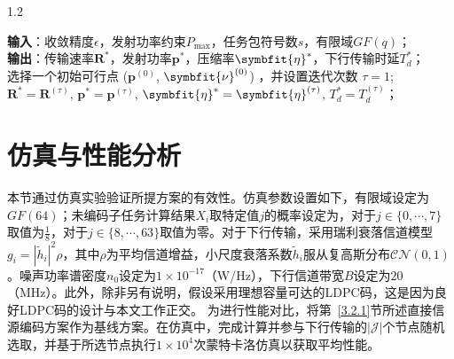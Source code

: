 \begin{algorithm}[h]
	\renewcommand{\thealgocf}{3.1}
	\begin{spacing}{1.2}
		{

			\caption{面向完整恢复的DSC辅助编码计算结果下行传输算法}
				\label{algorithm1}
			\LinesNumbered
 \textbf{输入}：收敛精度$\epsilon$，发射功率约束$P_{\max}$，任务包符号数$s$，有限域$GF(q)$；\\
\textbf{输出}：传输速率$\mathbf{R}^*$，发射功率$\mathbf{p}^*$，压缩率$\symbfit{\eta}^*$，下行传输时延$T_d^*$；\\

	选择一个初始可行点 ($\mathbf{p}^{(0)}$, $\symbfit{\nu}^{(0)}$) ，并设置迭代次数 $\tau=1$;\\
		$\mathbf{R}^*=\mathbf{R}^{(\tau)}$, $\mathbf{p}^*=\mathbf{p}^{(\tau)}$, $\symbfit{\eta}^*=\symbfit{\eta}^{(\tau)}$, $T_d^*=T_d^{(\tau)}$；
	}
	\end{spacing}
\end{algorithm}

\section{仿真与性能分析}\label{3.4}
本节通过仿真实验验证所提方案的有效性。仿真参数设置如下，有限域设定为$GF(64)$；未编码子任务计算结果$X_i$取特定值$j$的概率设定为，对于$j\in\{0,\cdots,7\}$取值为$\frac{1}{8}$，对于$j\in\{8,\cdots,63\}$取值为零。对于下行传输，采用瑞利衰落信道模型$g_i=|\tilde{h}_i|^2\rho$，其中$\rho$为平均信道增益，小尺度衰落系数$\tilde{h}_i$服从复高斯分布$\mathcal{CN}(0,1)$。噪声功率谱密度$n_0$设定为$1\times 10^{-17}$（W/Hz），下行信道带宽$B$设定为$20$（MHz）。此外，除非另有说明，假设采用理想容量可达的LDPC码，这是因为良好LDPC码的设计与本文工作正交。
为进行性能对比，将第~\ref{3.2.1}节所述直接信源编码方案作为基线方案。在仿真中，完成计算并参与下行传输的$|\mathcal{J}|$个节点随机选取，并基于所选节点执行$1\times10^4$次蒙特卡洛仿真以获取平均性能。

